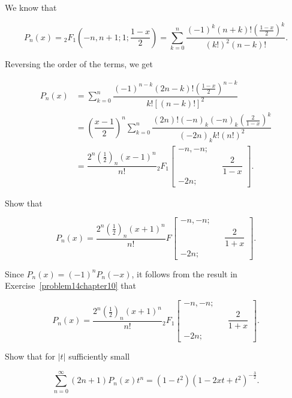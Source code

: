 \begin{solution}
We know that

$$P_n(x) = {}_2F_1 \left(-n, n+1; 1 ; \dfrac{1-x}{2} \right) = \displaystyle\sum_{k=0}^n \dfrac{(-1)^k (n+k)! ( \frac{1-x}{2})^k}{(k!)^2 (n-k)!}.$$

Reversing the order of the terms, we get

$$\begin{array}{ll}
P_n(x) &= \displaystyle\sum_{k=0}^n \dfrac{(-1)^{n-k} (2n-k)! (\frac{1-x}{2})^{n-k}}{k! [(n-k)!]^2} \\
&= \left( \dfrac{x-1}{2} \right)^n \displaystyle\sum_{k=0}^n \dfrac{(2n)! (-n)_k (-n)_k (\frac{2}{1-x})^k}{(-2n)_k k! (n!)^2} \\
&= \dfrac{2^n (\frac{1}{2})_n (x-1)^n}{n!} {}_2F_1 \left[ \begin{array}{rlr}
-n,-n; & & \\
& & \dfrac{2}{1-x} \\
-2n; & & 
\end{array} \right].
\end{array}$$
\end{solution}
\begin{problem}\label{problem15chapter10}
Show that

$$P_n(x) = \dfrac{2^n (\frac{1}{2})_n (x+1)^n}{n!} F \left[ \begin{array}{rlr}
-n, -n; & & \\
& & \dfrac{2}{1+x} \\
-2n; & &
\end{array} \right].$$
\end{problem}
\begin{solution}
Since $P_n(x) = (-1)^n P_n(-x)$, it follows from the result in Exercise~\ref{problem14chapter10} that

$$P_n(x) = \dfrac{2^n (\frac{1}{2})_n (x+1)^n}{n!} {}_2F_1 \left[ \begin{array}{rlr}
-n, -n; & & \\
& & \dfrac{2}{1+x} \\
-2n; & &
\end{array} \right].$$
\end{solution}
\begin{problem}\label{problem16chapter10}
Show that for $|t|$ sufficiently small

$$\displaystyle\sum_{n=0}^{\infty} (2n+1)P_n(x)t^n = (1-t^2)(1-2xt+t^2)^{-\frac{3}{2}}.$$
\end{problem}
